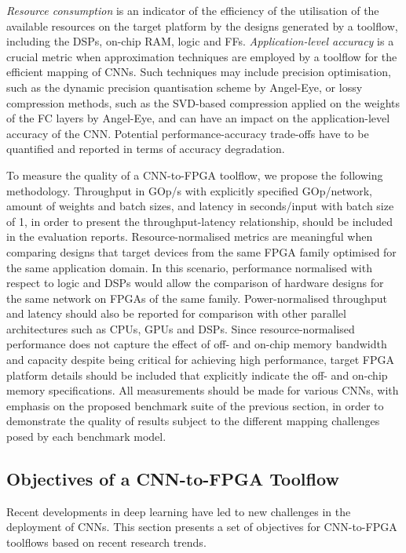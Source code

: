 \documentclass[format=acmsmall, review=false, screen=true]{acmart}
\begin{document}
\textit{Resource consumption} is an indicator of the efficiency of the utilisation of the available resources on the target platform by the designs generated by a toolflow, including the DSPs, on-chip RAM, logic and FFs. \textit{Application-level accuracy} is a crucial metric when approximation techniques are employed by a toolflow for the efficient mapping of CNNs. Such techniques may include precision optimisation, such as the dynamic precision quantisation scheme by Angel-Eye, or lossy compression methods, such as the SVD-based compression applied on the weights of the FC layers by Angel-Eye, and can have an impact on the application-level accuracy of the CNN. Potential performance-accuracy trade-offs have to be quantified and reported in terms of accuracy degradation.

To measure the quality of a CNN-to-FPGA toolflow, we propose the following methodology. Throughput in GOp/s with explicitly specified GOp/network, amount of weights and batch sizes, and latency in seconds/input with batch size of 1, in order to present the throughput-latency relationship, should be included in the evaluation reports. Resource-normalised metrics are meaningful when comparing designs that target devices from the same FPGA family optimised for the same application domain. In this scenario, performance normalised with respect to logic and DSPs would allow the comparison of hardware designs for the same network on FPGAs of the same family. Power-normalised throughput and latency should also be reported for comparison with other parallel architectures such as CPUs, GPUs and DSPs. Since resource-normalised performance does not capture the effect of off- and on-chip memory bandwidth and capacity despite being critical for achieving high performance, target FPGA platform details should be included that explicitly indicate the off- and on-chip memory specifications. All measurements should be made for various CNNs, with emphasis on the proposed benchmark suite of the previous section, in order to demonstrate the quality of results subject to the different mapping challenges posed by each benchmark model.

\vspace{-0.2cm}
\subsection{Objectives of a CNN-to-FPGA Toolflow}

Recent developments in deep learning have led to new challenges in the deployment of CNNs. This section presents a set of objectives for CNN-to-FPGA toolflows based on recent research trends.
\end{document}
